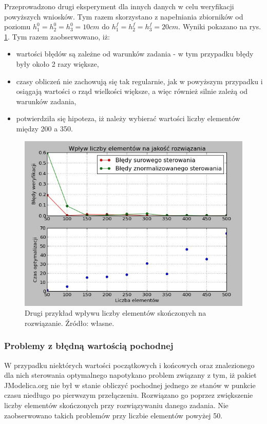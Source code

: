 Przeprowadzono drugi eksperyment dla innych danych w celu weryfikacji powyższych wniosków. Tym razem skorzystano z napełniania zbiorników od poziomu $h_{1}^{0} = h_{2}^{0} = h_{3}^{0} = 10 cm$ do $h_{1}^{f} = h_{2}^{f} = h_{3}^{f} = 20 cm$. Wyniki pokazano na rys. \ref{fig:elementsinfluence10-2050-500}. Tym razem zaobserwowano, iż:
\begin{itemize}
    \item wartości błędów są zależne od warunków zadania - w tym przypadku błędy były około 2 razy większe,
    \item czasy obliczeń nie zachowują się tak regularnie, jak w powyższym przypadku i osiągają wartości o rząd wielkości większe, a więc również silnie zależą od warunków zadania,
    \item potwierdziła się hipoteza, iż należy wybierać wartości liczby elementów między 200 a 350.
\end{itemize}

\begin{figure}[ht]
    \centering
    \includegraphics{Grafika/elements_influence_10-20_50-500}
    \caption{Drugi przykład wpływu liczby elementów skończonych na rozwiązanie. Źródło: własne.}
    \label{fig:elementsinfluence10-2050-500}
\end{figure}

\subsubsection{Problemy z błędną wartością pochodnej}

W przypadku niektórych wartości początkowych i końcowych oraz znalezionego dla nich sterowania optymalnego napotykano problem związany z tym, iż pakiet JModelica.org nie był w stanie obliczyć pochodnej jednego ze stanów w punkcie czasu niedługo po pierwszym przełączeniu. Rozwiązano go poprzez zwiększenie liczby elementów skończonych przy rozwiązywaniu danego zadania. Nie zaobserwowano takich problemów przy liczbie elementów powyżej 50.

